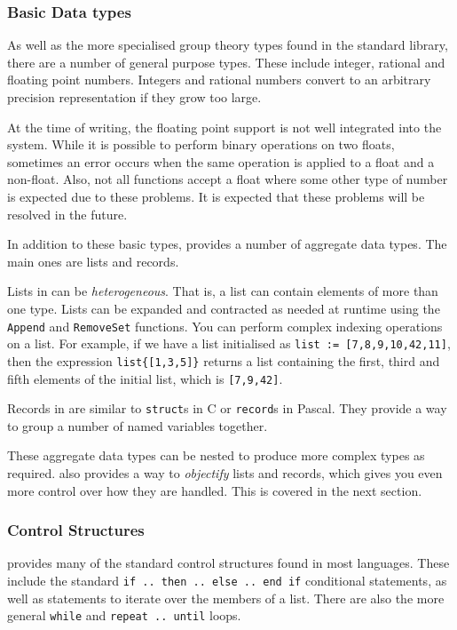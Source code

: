 \subsubsection{Basic Data types}

As well as the more specialised group theory types found in the
standard library, there are a number of general purpose types.  These
include integer, rational and floating point numbers.  Integers and
rational numbers convert to an arbitrary precision representation
if they grow too large.

At the time of writing, the floating point support is not well
integrated into the \GAP{} system.  While it is possible to perform
binary operations on two floats, sometimes an error occurs when the
same operation is applied to a float and a non-float.  Also, not all
functions accept a float where some other type of number is
expected due to these problems.  It is expected that these problems
will be resolved in the future.

In addition to these basic types, \GAP{} provides a number of aggregate
data types.  The main ones are lists and records.

Lists in \GAP{} can be \emph{heterogeneous}.  That is, a list can contain
elements of more than one type.  Lists can be expanded and contracted
as needed at runtime using the \texttt{Append} and \texttt{RemoveSet}
functions.  You can perform complex indexing operations on a list.
For example, if we have a list initialised as
\verb|list := [7,8,9,10,42,11]|, then the expression
\verb|list{[1,3,5]}| returns a list containing the first,
third and fifth elements of the initial list, which is \verb|[7,9,42]|.

Records in \GAP{} are similar to \texttt{struct}s in C or
\texttt{record}s in Pascal.  They provide a way to group a number of named
variables together.

These aggregate data types can be nested to produce more complex types
as required.  \GAP{} also provides a way to \emph{objectify} lists and
records, which gives you even more control over how they are handled.
This is covered in the next section.


\subsubsection{Control Structures}

\GAP{} provides many of the standard control structures found in most
languages.  These include the standard \texttt{if .. then .. else
.. end if} conditional statements, as well as statements to iterate
over the members of a list.  There are also the more general
\texttt{while} and \texttt{repeat .. until} loops.

